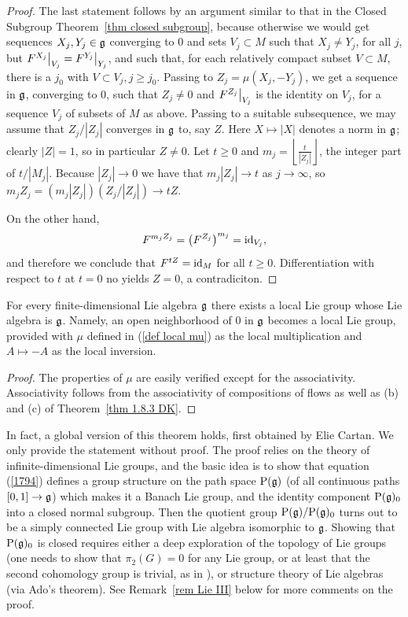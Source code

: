 \begin{proof}
    The last statement follows by an argument similar to that in the Closed Subgroup Theorem~\ref{thm closed subgroup}, because otherwise we would get sequences $X_j,Y_j\in\mathfrak{g}$ converging to $0$ and sets $V_j\subset M$ such that $X_j\neq Y_j$, for all $j$, but $\restr{F^{X_j}}{V_j}=\restr{F^{Y_j}}{Y_j}$, and such that, for each relatively compact subset $V\subset M$, there is a $j_0$ with $V\subset V_j,j\geq j_0$. Passing to $Z_j=\mu(X_j,-Y_j)$, we get a sequence in $\mathfrak{g}$, converging to $0$, such that $Z_j\neq 0$ and $\restr{F^{Z_j}}{V_j}$ is the identity on $V_j$, for a sequence $V_j$ of subsets of $M$ as above. Passing to a suitable subsequence, we may assume that $Z_j/|Z_j|$ converges in $\mathfrak{g}$ to, say $Z$. Here $X\mapsto |X|$ denotes a norm in $\mathfrak{g}$; clearly $|Z|=1$, so in particular $Z\neq 0$. Let $t\geq 0$ and $m_j=\left\lfloor\frac{t}{|Z_j|}\right\rfloor$, the integer part of $t/|M_j|$. Because $|Z_j|\to 0$ we have that $m_j|Z_j|\to t$ as $j\to \infty$, so $m_j Z_j=(m_j|Z_j|)(Z_j/|Z_j|)\to tZ$.

    On the other hand,
    \[F^{m_jZ_j}=\left(F^{Z_j}\right)^{m_j}=\operatorname{id}_{V_j},\]
    and therefore we conclude that $F^{tZ}=\operatorname{id}_{M}$ for all $t\geq 0$. Differentiation with respect to $t$ at $t=0$ no yields $Z=0$, a contradiciton.
\end{proof}


\begin{thm}\label{thm local Lie's third}
    For every finite-dimensional Lie algebra $\mathfrak{g}$ there exists a local Lie group whose Lie algebra is $\mathfrak{g}$. Namely, an open neighborhood of $0$ in $\mathfrak{g}$ becomes a local Lie group, provided with $\mu$ defined in (\ref{def local mu}) as the local multiplication and $A\mapsto -A$ as the local inversion.
\end{thm}
\begin{proof}
    The properties of $\mu$ are easily verified except for the associativity. Associativity follows from the associativity of compositions of flows as well as (b) and (c) of Theorem~\ref{thm 1.8.3 DK}.
\end{proof}

In fact, a global version of this theorem holds, first obtained by Elie Cartan. We only provide the statement without proof. The proof relies on the theory of infinite-dimensional Lie groups, and the basic idea is to show that equation (\ref{1794}) defines a group structure on the path space $\mathrm{P}(\mathfrak{g})$ (of all continuous paths $[0,1]\to \mathfrak{g}$) which makes it a Banach Lie group, and the identity component $\mathrm{P}(\mathfrak{g})_0$ into a closed normal subgroup. Then the quotient group $\mathrm{P}(\mathfrak{g})/\mathrm{P}(\mathfrak{g})_0$ turns out to be a simply connected Lie group with Lie algebra isomorphic to $\mathfrak{g}$. Showing that $\mathrm{P}(\mathfrak{g})_0$ is closed requires either a deep exploration of the topology of Lie groups (one needs to show that $\pi_2(G)=0$ for any Lie group, or at least that the second cohomology group is trivial, as in \cite{DK}), or structure theory of Lie algebras (via Ado's theorem). See Remark~\ref{rem Lie III} below for more comments on the proof.

